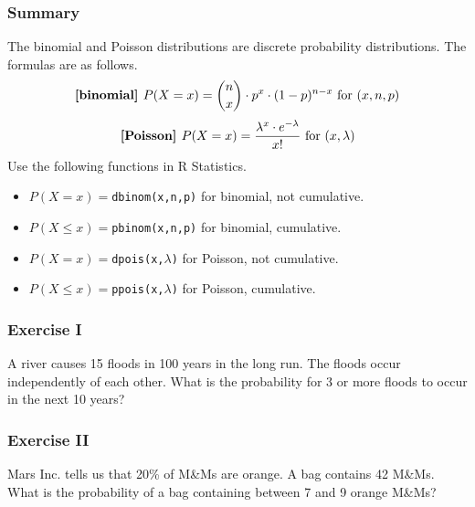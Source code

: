 \documentclass[xcolor=dvipsnames]{beamer}
\begin{document}

\begin{frame}
  \frametitle{Summary}
The binomial and Poisson distributions are discrete probability
distributions. The formulas are as follows.
\begin{equation}
  \label{eq:hiechoib}
  \mbox{\textbf{[binomial] }}P(X=x)=\binom{n}{x}\cdot{}p^{x}\cdot(1-p)^{n-x}\mbox{ for }(x,n,p)\notag
\end{equation}
\begin{equation}
  \label{eq:iechahve}
  \mbox{\textbf{[Poisson] }}P(X=x)=\frac{\lambda^{x}\cdot{}e^{-\lambda}}{x!}\mbox{ for }(x,\lambda)\notag
\end{equation}
Use the following functions in R Statistics.
\begin{itemize}
\item $P(X=x)=$\texttt{dbinom(x,n,p)} for binomial, not cumulative.
\item $P(X\leq{}x)=$\texttt{pbinom(x,n,p)} for binomial, cumulative.
\item $P(X=x)=$\texttt{dpois(x,$\lambda$)} for Poisson, not cumulative.
\item $P(X\leq{}x)=$\texttt{ppois(x,$\lambda$)} for Poisson, cumulative.
\end{itemize}
\end{frame}

\begin{frame}
  \frametitle{Exercise I}
  {\ubung} A river causes 15 floods in 100 years in the long run. The
  floods occur independently of each other. What is the probability
  for 3 or more floods to occur in the next 10 years?
\end{frame}

\begin{frame}
  \frametitle{Exercise II}
  {\ubung} Mars Inc. tells us that 20\% of M\&Ms are orange. A bag
  contains 42 M\&Ms. What is the probability of a bag containing
  between 7 and 9 orange M\&Ms?
\end{frame}
\end{document}
